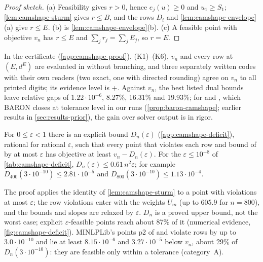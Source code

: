 \begin{proof}[Proof sketch]
(a) Feasibility gives $r>0$, hence $e_j(u)\ge0$ and $u_1\ge S_1$; \cref{lem:camshape-sturm} gives $r\le B$, and the rows $D_i$ and \cref{lem:camshape-envelope}(a) give $r\le E$.
(b) is \cref{lem:camshape-envelope}(b).
(c) A feasible point with objective $v_n$ has $r\le E$ and $\sum_jr_j=\sum_jE_j$, so $r=E$.
\end{proof}

In the certificate (\cref{app:camshape-proof}), (K1)--(K6), $v_n$ and every row at $(E,d^E)$ are evaluated in  without branching, and three separately written codes with their own readers (two exact, one with directed rounding) agree on $v_n$ to all printed digits; its evidence level is +.
Against $v_n$, the best listed dual bounds leave relative gaps of $1.22\cdot10^{-6}$, 8.27\%, 16.31\% and 19.93\%; for  and , which BARON closes at tolerance level in our runs (\cref{prop:baron-camshape}; earlier results in \cref{sec:results-prior}), the gain over solver output is in rigor.

\begin{proposition}\label{prop:camshape-deficit}
For $0\le\varepsilon<1$ there is an explicit bound $D_n(\varepsilon)$ (\cref{app:camshape-deficit}), rational for rational $\varepsilon$, such that every point that violates each row and bound of  by at most $\varepsilon$ has objective at least $v_n-D_n(\varepsilon)$.
For the $\varepsilon\le10^{-8}$ of \cref{tab:camshape-deficit}, $D_n(\varepsilon)\le0.61\,n^2\varepsilon$; for example $D_{400}(3\cdot10^{-10})\le2.81\cdot10^{-5}$ and $D_{800}(3\cdot10^{-10})\le1.13\cdot10^{-4}$.
\end{proposition}

The proof applies the identity of \cref{lem:camshape-sturm} to a point with violations at most $\varepsilon$; the row violations enter with the weights $U_m$ (up to 605.9 for $n=800$), and the bounds and slopes are relaxed by $\varepsilon$.
$D_n$ is a proved upper bound, not the worst case; explicit $\varepsilon$-feasible points reach about 87\% of it (numerical evidence, \cref{fig:camshape-deficit}).
MINLPLib's points p2 of  and  violate rows by up to $3.0\cdot10^{-10}$ and lie at least $8.15\cdot10^{-6}$ and $3.27\cdot10^{-5}$ below $v_n$, about 29\% of $D_n(3\cdot10^{-10})$: they are feasible only within a tolerance (category~A).

